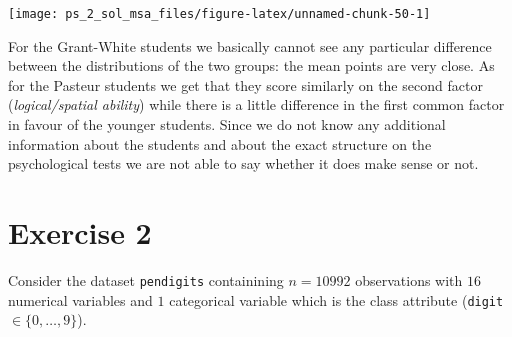 \documentclass[
]{article}
\newenvironment{Shaded}{\begin{snugshade}}{\end{snugshade}}
\newcommand{\AttributeTok}[1]{\textcolor[rgb]{0.13,0.29,0.53}{#1}}
\newcommand{\DecValTok}[1]{\textcolor[rgb]{0.00,0.00,0.81}{#1}}
\newcommand{\FunctionTok}[1]{\textcolor[rgb]{0.13,0.29,0.53}{\textbf{#1}}}
\newcommand{\NormalTok}[1]{#1}
\newcommand{\OtherTok}[1]{\textcolor[rgb]{0.56,0.35,0.01}{#1}}
\newcommand{\SpecialCharTok}[1]{\textcolor[rgb]{0.81,0.36,0.00}{\textbf{#1}}}
\newcommand{\StringTok}[1]{\textcolor[rgb]{0.31,0.60,0.02}{#1}}
\theoremstyle{plain}
\begin{document}
\begin{center}\texttt{[image: ps\_2\_sol\_msa\_files/figure-latex/unnamed-chunk-50-1]} \end{center}

For the Grant-White students we basically cannot see any particular
difference between the distributions of the two groups: the mean points
are very close. As for the Pasteur students we get that they score
similarly on the second factor (\textit{logical/spatial ability}) while
there is a little difference in the first common factor in favour of the
younger students. Since we do not know any additional information about
the students and about the exact structure on the psychological tests we
are not able to say whether it does make sense or not.

\newpage

\hypertarget{exercise-2}{%
\section{Exercise 2}\label{exercise-2}}

Consider the dataset \texttt{pendigits} containining \(n = 10992\)
observations with \(16\) numerical variables and \(1\) categorical
variable which is the class attribute (\texttt{digit}
\(\in \{0, \dots, 9\}\)).

\smallskip

\begin{Shaded}
\end{Shaded}
\end{document}
